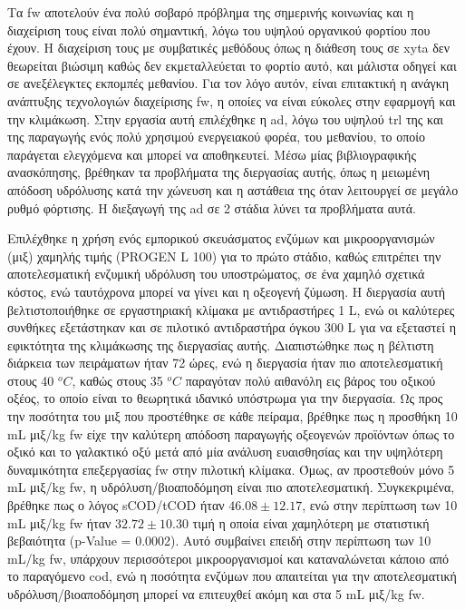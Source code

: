 \documentclass[11pt]{report}
\begin{document}
Τα \acrfull{fw} αποτελούν ένα πολύ σοβαρό πρόβλημα της σημερινής κοινωνίας και η διαχείριση τους είναι πολύ σημαντική, λόγω του υψηλού οργανικού φορτίου που έχουν. Η διαχείριση τους με συμβατικές μεθόδους όπως η διάθεση τους σε \acrshort{xyta} δεν θεωρείται βιώσιμη καθώς δεν εκμεταλλεύεται το φορτίο αυτό, και μάλιστα οδηγεί και σε ανεξέλεγκτες εκπομπές μεθανίου. Για τον λόγο αυτόν, είναι επιτακτική η ανάγκη ανάπτυξης τεχνολογιών διαχείρισης \acrshort{fw}, η οποίες να είναι εύκολες στην εφαρμογή και την κλιμάκωση. Στην εργασία αυτή επιλέχθηκε η \acrfull{ad}, λόγω του υψηλού \acrshort{trl} της και της παραγωγής ενός πολύ χρησιμού ενεργειακού φορέα, του μεθανίου, το οποίο παράγεται ελεγχόμενα και μπορεί να αποθηκευτεί. Μέσω μίας βιβλιογραφικής ανασκόπησης, βρέθηκαν τα προβλήματα της διεργασίας αυτής, όπως η μειωμένη απόδοση υδρόλυσης κατά την χώνευση και η αστάθεια της όταν λειτουργεί σε μεγάλο ρυθμό φόρτισης. Η διεξαγωγή της \acrshort{ad} σε 2 στάδια λύνει τα προβλήματα αυτά.

Επιλέχθηκε η χρήση ενός εμπορικού σκευάσματος ενζύμων και μικροοργανισμών (μιξ) χαμηλής τιμής (PROGEN L 100) για το πρώτο στάδιο, καθώς επιτρέπει την αποτελεσματική ενζυμική υδρόλυση του υποστρώματος, σε ένα χαμηλό σχετικά κόστος, ενώ ταυτόχρονα μπορεί να γίνει και η οξεογενή ζύμωση. Η διεργασία αυτή βελτιστοποιήθηκε σε εργαστηριακή κλίμακα με αντιδραστήρες 1 L, ενώ οι καλύτερες συνθήκες εξετάστηκαν και σε πιλοτικό αντιδραστήρα όγκου 300 L για να εξεταστεί η εφικτότητα της κλιμάκωσης της διεργασίας αυτής. Διαπιστώθηκε πως η βέλτιστη διάρκεια των πειράματων ήταν 72 ώρες, ενώ η διεργασία ήταν πιο αποτελεσματική στους 40 \(^oC\), καθώς στους 35 \(^oC\) παραγόταν πολύ αιθανόλη εις βάρος του οξικού οξέος, το οποίο είναι το θεωρητικά ιδανικό υπόστρωμα για την διεργασία. Ως προς την ποσότητα του μιξ που προστέθηκε σε κάθε πείραμα, βρέθηκε πως η προσθήκη 10 mL μιξ/kg \acrshort{fw} είχε την καλύτερη απόδοση παραγωγής οξεογενών προϊόντων όπως το οξικό και το γαλακτικό οξύ μετά από μία ανάλυση ευαισθησίας και την υψηλότερη δυναμικότητα επεξεργασίας \acrshort{fw} στην πιλοτική κλίμακα. Όμως, αν προστεθούν μόνο 5 mL μιξ/kg \acrshort{fw}, η υδρόλυση/βιοαποδόμηση είναι πιο αποτελεσματική. Συγκεκριμένα, βρέθηκε πως ο λόγος sCOD/tCOD ήταν \(46.08 \pm 12.17\), ενώ στην περίπτωση των 10 mL μιξ/kg \acrshort{fw} ήταν \(32.72 \pm 10.30\) τιμή η οποία είναι χαμηλότερη με στατιστική βεβαιότητα (p-Value = 0.0002). Αυτό συμβαίνει επειδή στην περίπτωση των 10 mL/kg \acrshort{fw}, υπάρχουν περισσότεροι μικροοργανισμοί και καταναλώνεται κάποιο από το παραγόμενο \acrshort{cod}, ενώ η ποσότητα ενζύμων που απαιτείται για την αποτελεσματική υδρόλυση/βιοαποδόμηση μπορεί να επιτευχθεί ακόμη και στα 5 mL μιξ/kg \acrshort{fw}.
\end{document}

